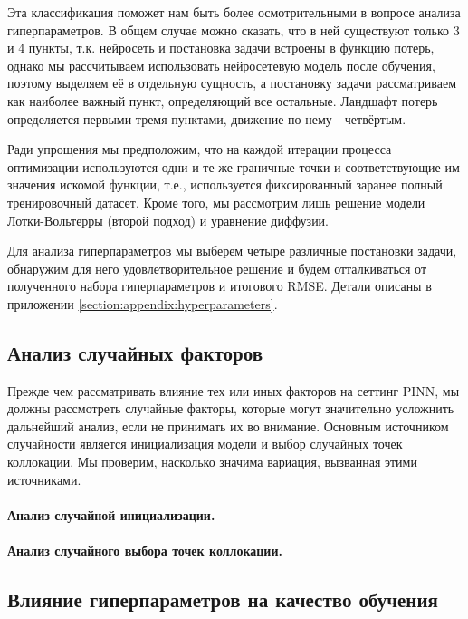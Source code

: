\documentclass[a4paper, 12pt]{article}
\begin{document}
Эта классификация поможет нам быть более осмотрительными в вопросе анализа гиперпараметров. В общем случае можно сказать, что в ней существуют только 3 и 4 пункты, т.к. нейросеть и постановка задачи встроены в функцию потерь, однако мы рассчитываем использовать нейросетевую модель после обучения, поэтому выделяем её в отдельную сущность, а постановку задачи рассматриваем как наиболее важный пункт, определяющий все остальные. Ландшафт потерь определяется первыми тремя пунктами, движение по нему - четвёртым.

Ради упрощения мы предположим, что на каждой итерации процесса оптимизации используются одни и те же граничные точки и соответствующие им значения искомой функции, т.е., используется фиксированный заранее полный тренировочный датасет. Кроме того, мы рассмотрим лишь решение модели Лотки-Вольтерры (второй подход) и уравнение диффузии.

Для анализа гиперпараметров мы выберем четыре различные постановки задачи, обнаружим для него удовлетворительное решение и будем отталкиваться от полученного набора гиперпараметров и итогового RMSE. Детали описаны в приложении \ref{section:appendix:hyperparameters}.

\subsection{Анализ случайных факторов}

Прежде чем рассматривать влияние тех или иных факторов на сеттинг PINN, мы должны рассмотреть случайные факторы, которые могут значительно усложнить дальнейший анализ, если не принимать их во внимание. Основным источником случайности является инициализация модели и выбор случайных точек коллокации. Мы проверим, насколько значима вариация, вызванная этими источниками.

\paragraph{Анализ случайной инициализации.}

\paragraph{Анализ случайного выбора точек коллокации.}

\subsection{Влияние гиперпараметров на качество обучения}
\end{document}
